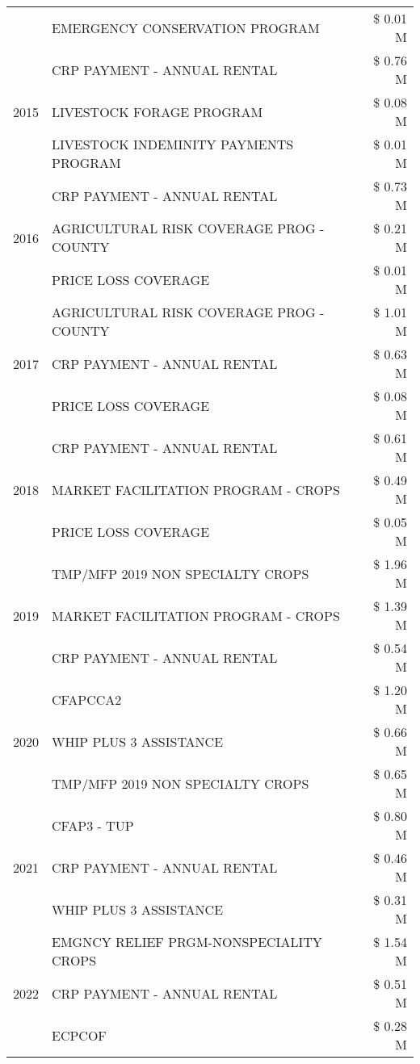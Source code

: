 \begin{tabular}{llr}
 & EMERGENCY CONSERVATION PROGRAM & \$ 0.01 M \\
\cline{1-3}
\multirow[t]{3}{*}{2015} & CRP PAYMENT - ANNUAL RENTAL & \$ 0.76 M \\
 & LIVESTOCK FORAGE PROGRAM & \$ 0.08 M \\
 & LIVESTOCK INDEMINITY PAYMENTS PROGRAM & \$ 0.01 M \\
\cline{1-3}
\multirow[t]{3}{*}{2016} & CRP PAYMENT - ANNUAL RENTAL & \$ 0.73 M \\
 & AGRICULTURAL RISK COVERAGE PROG - COUNTY & \$ 0.21 M \\
 & PRICE LOSS COVERAGE & \$ 0.01 M \\
\cline{1-3}
\multirow[t]{3}{*}{2017} & AGRICULTURAL RISK COVERAGE PROG - COUNTY & \$ 1.01 M \\
 & CRP PAYMENT - ANNUAL RENTAL & \$ 0.63 M \\
 & PRICE LOSS COVERAGE & \$ 0.08 M \\
\cline{1-3}
\multirow[t]{3}{*}{2018} & CRP PAYMENT - ANNUAL RENTAL & \$ 0.61 M \\
 & MARKET FACILITATION PROGRAM - CROPS & \$ 0.49 M \\
 & PRICE LOSS COVERAGE & \$ 0.05 M \\
\cline{1-3}
\multirow[t]{3}{*}{2019} & TMP/MFP 2019 NON SPECIALTY CROPS & \$ 1.96 M \\
 & MARKET FACILITATION PROGRAM - CROPS & \$ 1.39 M \\
 & CRP PAYMENT - ANNUAL RENTAL & \$ 0.54 M \\
\cline{1-3}
\multirow[t]{3}{*}{2020} & CFAPCCA2 & \$ 1.20 M \\
 & WHIP PLUS 3 ASSISTANCE & \$ 0.66 M \\
 & TMP/MFP 2019 NON SPECIALTY CROPS & \$ 0.65 M \\
\cline{1-3}
\multirow[t]{3}{*}{2021} & CFAP3 - TUP & \$ 0.80 M \\
 & CRP PAYMENT - ANNUAL RENTAL & \$ 0.46 M \\
 & WHIP PLUS 3 ASSISTANCE & \$ 0.31 M \\
\cline{1-3}
\multirow[t]{3}{*}{2022} & EMGNCY RELIEF PRGM-NONSPECIALITY CROPS & \$ 1.54 M \\
 & CRP PAYMENT - ANNUAL RENTAL & \$ 0.51 M \\
 & ECPCOF & \$ 0.28 M \\
\cline{1-3}
\bottomrule
\end{tabular}
